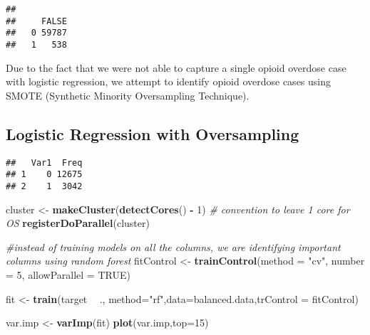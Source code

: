 \documentclass[]{article}
\newenvironment{Shaded}{\begin{snugshade}}{\end{snugshade}}
\newcommand{\KeywordTok}[1]{\textcolor[rgb]{0.13,0.29,0.53}{\textbf{#1}}}
\newcommand{\DataTypeTok}[1]{\textcolor[rgb]{0.13,0.29,0.53}{#1}}
\newcommand{\DecValTok}[1]{\textcolor[rgb]{0.00,0.00,0.81}{#1}}
\newcommand{\StringTok}[1]{\textcolor[rgb]{0.31,0.60,0.02}{#1}}
\newcommand{\CommentTok}[1]{\textcolor[rgb]{0.56,0.35,0.01}{\textit{#1}}}
\newcommand{\OtherTok}[1]{\textcolor[rgb]{0.56,0.35,0.01}{#1}}
\newcommand{\OperatorTok}[1]{\textcolor[rgb]{0.81,0.36,0.00}{\textbf{#1}}}
\newcommand{\NormalTok}[1]{#1}
\begin{document}
\begin{verbatim}
##    
##     FALSE
##   0 59787
##   1   538
\end{verbatim}

Due to the fact that we were not able to capture a single opioid
overdose case with logistic regression, we attempt to identify opioid
overdose cases using SMOTE (Synthetic Minority Oversampling Technique).

\subsection{Logistic Regression with
Oversampling}\label{logistic-regression-with-oversampling}

\begin{Shaded}
\end{Shaded}

\begin{verbatim}
##   Var1  Freq
## 1    0 12675
## 2    1  3042
\end{verbatim}

\begin{Shaded}
\begin{Highlighting}[]
\NormalTok{cluster <-}\StringTok{ }\KeywordTok{makeCluster}\NormalTok{(}\KeywordTok{detectCores}\NormalTok{() }\OperatorTok{-}\StringTok{ }\DecValTok{1}\NormalTok{) }\CommentTok{# convention to leave 1 core for OS}
\KeywordTok{registerDoParallel}\NormalTok{(cluster)}


\CommentTok{#instead of training models on all the columns, we are identifying important columns using random forest }
\NormalTok{fitControl <-}\StringTok{ }\KeywordTok{trainControl}\NormalTok{(}\DataTypeTok{method =} \StringTok{"cv"}\NormalTok{, }\DataTypeTok{number =} \DecValTok{5}\NormalTok{, }\DataTypeTok{allowParallel =} \OtherTok{TRUE}\NormalTok{)}

\NormalTok{fit <-}\StringTok{ }\KeywordTok{train}\NormalTok{(target }\OperatorTok{~}\StringTok{ }\NormalTok{., }\DataTypeTok{method=}\StringTok{"rf"}\NormalTok{,}\DataTypeTok{data=}\NormalTok{balanced.data,}\DataTypeTok{trControl =}\NormalTok{ fitControl)}

\NormalTok{var.imp <-}\StringTok{ }\KeywordTok{varImp}\NormalTok{(fit)}
\KeywordTok{plot}\NormalTok{(var.imp,}\DataTypeTok{top=}\DecValTok{15}\NormalTok{)}
\end{Highlighting}
\end{Shaded}
\end{document}
